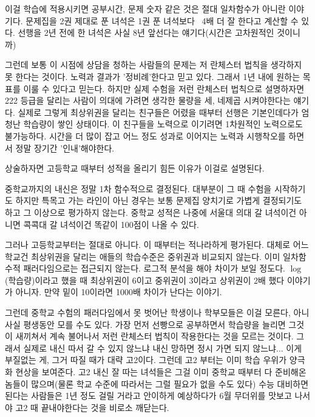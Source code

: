 이걸 학습에 적용시키면 공부시간, 문제 숫자 같은 것은 절대 일차함수가 아니란 이야기다.
문제집을 2권 제대로 푼 녀석은 1권 푼 녀석보다  4배 더 잘 한다고 계산할 수 있다.
선행을 2년 전에 한 녀석은 사실 8년 앞선다는 얘기다(시간은 고차원적인 것이니까)
\vspace{5mm}

그런데 보통 이 시점에 상담을 청하는 사람들의 문제는 저 란체스터 법칙을 생각하지 못 한다는 것이다.
노력과 결과가 '정비례'한다고 믿고 있다. 그래서 1년 내에 원하는 목표를 이룰 수 있다고 믿는다.
하지만 실제 수험을 저런 란체스터 법칙으로 설명하자면 222 등급을 달리는 사람이 의대에 가려면 생각한 물량을 세, 네제곱 시켜야한다는 얘기다.
실제로 그렇게 최상위권을 달리는 친구들은 어렸을 때부터 선행은 기본인데다가 엄청난 학습량이 쌓인 상태이다.
이 친구들을 노력으로 이기려면 1차원적인 노력으로도 불가능하다.
시간을 더 많이 잡고 어느 정도 성과로 이어지는 노력과 시행착오를 하면서 정말 장기간 '인내'해야한다.
\vspace{5mm}

상술하자면 고등학교 때부터 성적을 올리기 힘든 이유가 이걸로 설명된다.
\vspace{5mm}

중학교까지의 내신은 정말 1차 함수적으로 결정된다. 대부분이 그 때 수험을 시작하기도 하지만
특목고 가는 라인이 아닌 경우는 보통 문제집 양치기로 가볍게 결정되기도 하고 그 이상으로 평가하지 않는다.
중학교 성적은 나중에 서울대 의대 갈 녀석이건 아니면 콕콕대 갈 녀석이건 똑같이 100점이 나올 수 있다.
\vspace{5mm}

그러나 고등학교부터는 절대로 아니다. 이 때부터는 적나라하게 평가된다.
대체로 어느 학교건 최상위권을 달리는 애들의 학습수준은 중위권과 비교되지 않는다. 이미 일차함수적 패러다임으로는 접근되지 않는다.
로그적 분석을 해야 차이가 보일 정도다. $\log$(학습량)이라고 했을 때 최상위권이 6이고 중위권이 3이라고 상위권이 2배 했다 이야기가 아니자.
만약 밑이 10이라면 1000배 차이가 난다는 이야기.
\vspace{5mm}

그런데 중학교 수험의 패러다임에서 못 벗어난 학생이나 학부모들은 이걸 모른다, 아니 사실 평생동안 모를 수도 있다.
가장 먼저 선빵으로 공부하면서 학습량을 늘리면 그것이 새끼쳐서 계속 불어나서 저런 란체스터 법칙이 작용한다는 것을 모르는 것이다.
그래서 실제로 내신 따서 갈 수 있지 않느냐 내신 망하면 정시 가면 되지 않느냐... 이게 부질없는 게, 그거 따질 때가 대략 고2이다.
그런데 고2 부터는 이미 학습 우위가 양극화 현상을 보여준다.
고2 내신 잘 따는 녀석들은 그걸 이미 중학교 때부터 다 준비해온 놈들이 많으며(물론 학교 수준에 따라서는 그럴 필요가 없을 수도 있다)
수능 대비하면 된다는 사람들은 1년 정도 걸릴 거라고 안이하게 예상하다가 6월 무더위를 맛보고 나서야 고2 때 끝내야한다는 것을 비로소 깨닫는다.
\vspace{5mm}


